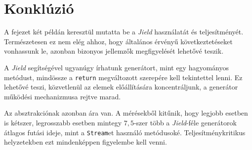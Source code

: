 \section{Konklúzió}

A fejezet két példán keresztül mutatta be a \textit{Jield} használatát és teljesítményét. Természetesen ez nem elég ahhoz, hogy általános érvényű következtetéseket vonhassunk le, azonban bizonyos jellemzők megfigyelését lehetővé teszik.

A \textit{Jield} segítségével ugyanúgy írhatunk generátort, mint egy hagyományos metódust, mindössze a \texttt{return} megváltozott szerepére kell tekintettel lenni. Ez lehetővé teszi, közvetlenül az elemek előállítására koncentráljunk, a generátor működési mechanizmusa rejtve marad.

Az absztrakciónak azonban ára van. A mérésekből kitűnik, hogy legjobb esetben is kétszer, legrosszabb esetben mintegy $7,5$-szer több a \textit{Jield}-féle generátorok átlagos futási ideje, mint a \texttt{Stream}et használó metódusoké. Teljesítménykritikus helyzetekben ezt mindenképpen figyelembe kell venni.
